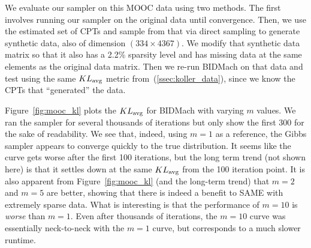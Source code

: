\documentclass{article} %
\begin{document}
We evaluate our sampler on this MOOC data using two methods. The first involves running our sampler
on the original data until convergence. Then, we use the estimated set of CPTs and sample from that
via direct sampling to generate synthetic data, also of dimension $(334 \times 4367)$. We modify
that synthetic data matrix so that it also has a 2.2\% sparsity level and has missing data at the
same elements as the original data matrix. Then we re-run BIDMach on that data and test using the
same $KL_{\rm avg}$ metric from~(\ref{ssec:koller_data}), since we know the CPTs that ``generated''
the data.

Figure~\ref{fig:mooc_kl} plots the $KL_{\rm avg}$ for BIDMach with varying $m$ values. We ran the
sampler for several thousands of iterations but only show the first 300 for the sake of readability.
We see that, indeed, using $m=1$ as a reference, the Gibbs sampler appears to converge quickly to
the true distribution. It seems like the curve gets worse after the first 100 iterations, but
the long term trend (not shown here) is that it settles down at the same $KL_{\rm avg}$ from the 100
iteration point. It is also apparent from Figure~\ref{fig:mooc_kl} (and the long-term trend) that
$m=2$ and $m=5$ are better, showing that there is indeed a benefit to SAME with extremely sparse
data. What is interesting is that the performance of $m=10$ is \emph{worse} than $m=1$. Even after
thousands of iterations, the $m=10$ curve was essentially neck-to-neck with the $m=1$ curve, but
corresponds to a much slower runtime.
\end{document}
